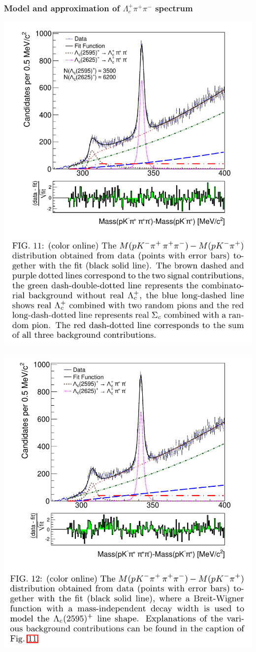 \documentclass[10pt]{beamer}
\begin{document}
\begin{frame}[label=fit-Lc*]%
  \frametitle{Model and approximation of $\Lambda_c^+\pi^+\pi^-$ spectrum}
  \parbox[w]{.48\textwidth}{
    \includegraphics[width=.48\textwidth]{figures/001/fit-Lcstar}
  } \parbox[w]{.48\textwidth}{
    \includegraphics[width=.48\textwidth]{figures/001/fit-Lcstar-simple2595}
  }

\end{frame}%
\end{document}
